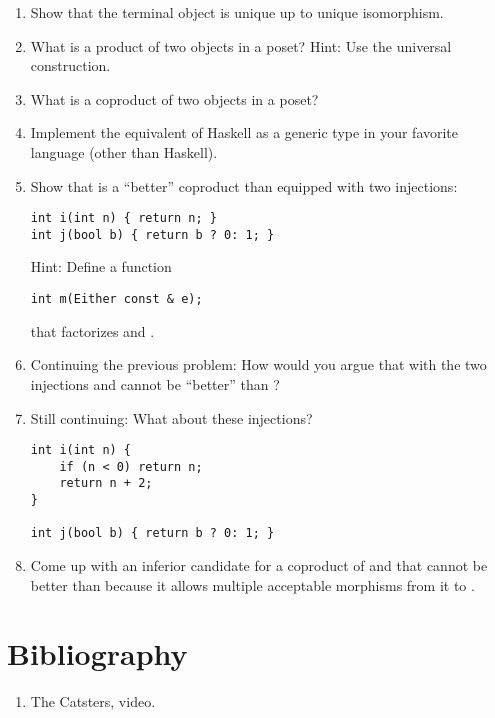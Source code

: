 \begin{enumerate}
\tightlist
\item
  Show that the terminal object is unique up to unique isomorphism.
\item
  What is a product of two objects in a poset? Hint: Use the universal
  construction.
\item
  What is a coproduct of two objects in a poset?
\item
  Implement the equivalent of Haskell  as a generic type
  in your favorite language (other than Haskell).
\item
  Show that  is a ``better'' coproduct than 
  equipped with two injections:

\begin{Verbatim}
int i(int n) { return n; }
int j(bool b) { return b ? 0: 1; }
\end{Verbatim}

  Hint: Define a function

\begin{Verbatim}
int m(Either const & e);
\end{Verbatim}

  that factorizes  and .
\item
  Continuing the previous problem: How would you argue that 
  with the two injections  and  cannot be ``better''
  than ?
\item
  Still continuing: What about these injections?

\begin{Verbatim}
int i(int n) { 
    if (n < 0) return n;
    return n + 2;
}

int j(bool b) { return b ? 0: 1; }
\end{Verbatim}
\item
  Come up with an inferior candidate for a coproduct of  and
   that cannot be better than  because it
  allows multiple acceptable morphisms from it to .
\end{enumerate}

\section{Bibliography}

\begin{enumerate}
\tightlist
\item
  The Catsters,
   video.
\end{enumerate}
